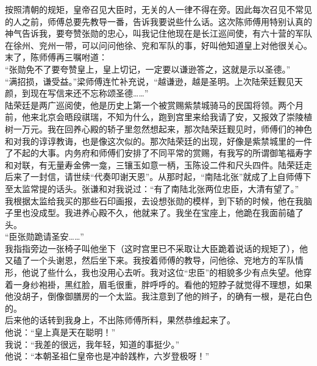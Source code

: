 按照清朝的规矩，皇帝召见大臣时，无关的人一律不得在旁。因此每次召见不常见的人之前，师傅总要先教导一番，告诉我要说些什么话。这次陈师傅用特别认真的神气告诉我，要夸赞张勋的忠心，叫我记住他现在是长江巡间使，有六十营的军队在徐州、兖州一带，可以问问他徐、兖和军队的事，好叫他知道皇上对他很关心。末了，陈师傅再三嘱咐道：\\

“张勋免不了要夸赞皇上，皇上切记，一定要以谦逊答之，这就是示以圣德。”\\

“满招损，谦受益。”梁师傅连忙补充说，“越谦逊，越是圣明。上次陆荣廷觐见天颜，到现在写信来还不忘称颂圣德……”\\

陆荣廷是两广巡阅使，他是历史上第一个被赏赐紫禁城骑马的民国将领。两个月前，他来北京会晤段祺瑞，不知为什么，跑到宫里来给我请了安，又报效了崇陵植树一万元。我在回养心殿的轿子里忽然想起来，那次陆荣廷觐见时，师傅们的神色和对我的谆谆教诲，也是像这次似的。那次陆荣廷的出现，好像是紫禁城里的一件了不起的大事。内务府和师傅们安排了不同平常的赏赐，有我写的所谓御笔福寿字和对联，有无量寿金佛一龛，三镶玉如意一柄，玉陈设二件和尺头四件。陆荣廷走后来了一封信，请世续“代奏叩谢天恩”。从那时起，“南陆北张”就成了上自师傅下至太监常提的话头。张谦和对我说过：“有了南陆北张两位忠臣，大清有望了。”\\

我根据太监给我买的那些石印画报，去设想张勋的模样，到下轿的时候，他在我脑子里也没成型。我进养心殿不久，他就来了。我坐在宝座上，他跪在我面前磕了头。\\

“臣张勋跪请圣安……”\\

我指指旁边一张椅子叫他坐下（这时宫里已不采取让大臣跪着说话的规矩了），他又磕了一个头谢恩，然后坐下来。我按着师傅的教导，问他徐、兖地方的军队情形，他说了些什么，我也没用心去听。我对这位“忠臣”的相貌多少有点失望。他穿着一身纱袍褂，黑红脸，眉毛很重，胖呼呼的。看他的短脖子就觉得不理想，如果他没胡子，倒像御膳房的一个太监。我注意到了他的辫子，的确有一根，是花白色的。\\

后来他的话转到我身上，不出陈师傅所料，果然恭维起来了。\\

他说：“皇上真是天在聪明！”\\

我说：“我差的很远，我年轻，知道的事挺少。”\\

他说：“本朝圣祖仁皇帝也是冲龄践柞，六岁登极呀！”\\

